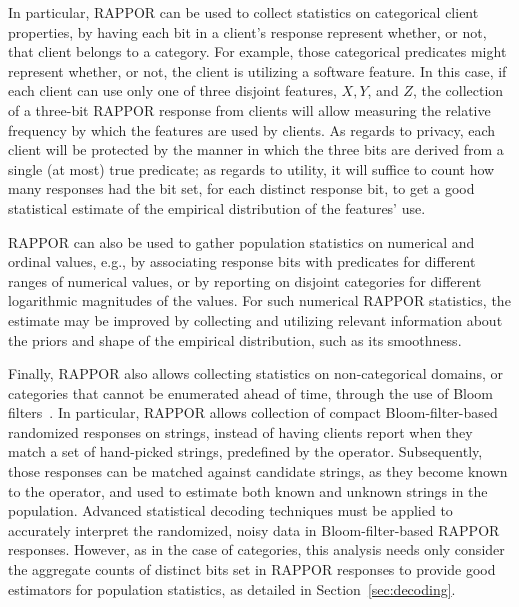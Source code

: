 \documentclass{sig-alternate-2013}
\newcommand\RAPPOR{{RAPPOR}}
\begin{document}
In particular,
\RAPPOR{} can be used to
collect 
statistics on 
categorical client properties,
by having each bit in a client's response
represent whether, or not, that client belongs to a category.
For example, those categorical predicates 
might represent 
whether, or not, the client is utilizing a software feature.
In this case,
if each client can use only one of three disjoint features, $X, Y$, and $Z$, 
the collection of a three-bit \RAPPOR{} response from clients
will allow measuring
the relative frequency 
by which the features are used by clients.
As regards to privacy,
each client will be protected
by the manner in which 
the three bits are derived from a single (at most) true predicate;
as regards to utility,
it will suffice to count how many responses had the bit set, for each distinct response bit,
to get a good statistical estimate of the empirical distribution of the features' use.


\RAPPOR{}
can also be used to 
gather
population statistics on 
numerical and ordinal values,
e.g., 
by associating response bits
with predicates for different ranges of numerical values,
or by reporting on
disjoint categories for different logarithmic magnitudes of the values.
For such numerical \RAPPOR{} statistics,
the estimate may be improved
by collecting and utilizing
relevant information about the priors and shape of
the empirical distribution, such as its smoothness.


Finally,
\RAPPOR{}
also allows collecting statistics on
non-categorical domains, or categories that cannot be enumerated ahead of time,
through the use of Bloom filters~\cite{bloom}.
In particular, \RAPPOR{}
allows collection of compact Bloom-filter-based randomized responses on strings,
instead of 
having clients report
when they match a set of hand-picked strings, predefined by the operator.
Subsequently,
those responses can be matched against candidate strings, as they become known to the operator,
and used to estimate both known and unknown strings in the population.
Advanced statistical decoding techniques must be applied
to accurately interpret the randomized, noisy data in Bloom-filter-based \RAPPOR{} responses.
However, as in the case of categories,
this analysis needs only consider the aggregate counts of distinct bits set in \RAPPOR{} responses
to provide good estimators for population statistics,
as detailed in Section~\ref{sec:decoding}.
\end{document}
